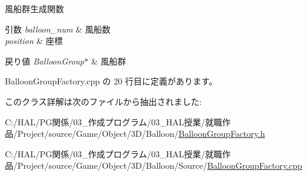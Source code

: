 風船群生成関数 


\begin{DoxyParams}{引数}
{\em balloon\+\_\+num} & 風船数 \\
\hline
{\em position} & 座標 \\
\hline
\end{DoxyParams}

\begin{DoxyRetVals}{戻り値}
{\em Balloon\+Group$\ast$} & 風船群 \\
\hline
\end{DoxyRetVals}


 Balloon\+Group\+Factory.\+cpp の 20 行目に定義があります。



このクラス詳解は次のファイルから抽出されました\+:\begin{DoxyCompactItemize}
\item 
C\+:/\+H\+A\+L/\+P\+G関係/03\+\_\+作成プログラム/03\+\_\+\+H\+A\+L授業/就職作品/\+Project/source/\+Game/\+Object/3\+D/\+Balloon/\mbox{\hyperlink{_balloon_group_factory_8h}{Balloon\+Group\+Factory.\+h}}\item 
C\+:/\+H\+A\+L/\+P\+G関係/03\+\_\+作成プログラム/03\+\_\+\+H\+A\+L授業/就職作品/\+Project/source/\+Game/\+Object/3\+D/\+Balloon/\+Source/\mbox{\hyperlink{_balloon_group_factory_8cpp}{Balloon\+Group\+Factory.\+cpp}}\end{DoxyCompactItemize}
